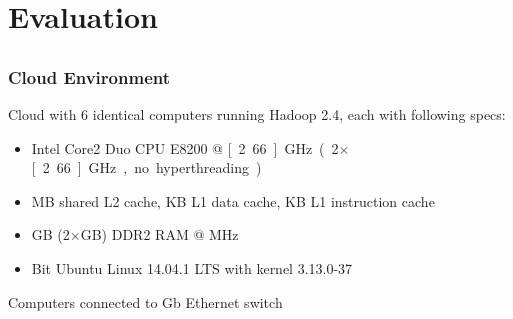 \section{Evaluation}
\subsection{}

\begin{frame}
  \frametitle{Cloud Environment}
  Cloud with 6 identical computers running Hadoop 2.4, each with following specs:
  \begin{itemize}
    \item Intel Core2 Duo CPU E8200 @ \unit[2.66]{GHz} (2$\times$\unit[2.66]{GHz}, no hyperthreading)
    \item \unit[6]{MB} shared L2 cache, \unit[32]{KB} L1 data cache, \unit[32]{KB} L1 instruction cache
    \item \unit[4]{GB} (2$\times$\unit[2]{GB}) DDR2 RAM @ \unit[667]{MHz}
    \item \unit[64]{Bit} Ubuntu Linux 14.04.1 LTS with kernel 3.13.0-37
  \end{itemize}
  \vspace{1em}
  Computers connected to \unit[1]{Gb} Ethernet switch
\end{frame}



